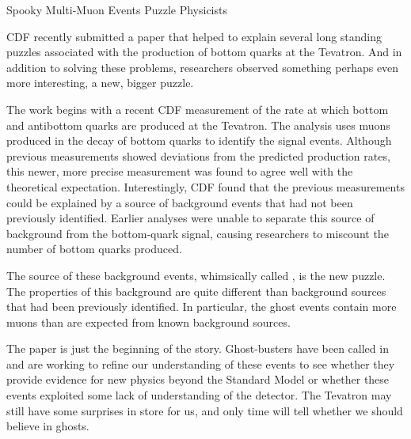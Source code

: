 \begin{multimuons-2}[enhanced, tikz={rotate=0}]{Spooky Multi-Muon Events Puzzle Physicists}
  \begin{multicols}{3}
    CDF recently submitted a paper that helped to explain several long
    standing puzzles associated with the production of bottom quarks
    at the Tevatron. And in addition to solving these problems,
    researchers observed something perhaps even more interesting, a
    new, bigger puzzle. 
    
    The work begins with a recent CDF measurement of the rate at which
    bottom and antibottom quarks are produced at the Tevatron. The
    analysis uses muons produced in the decay of bottom quarks to identify
    the signal events. Although previous measurements showed deviations
    from the predicted production rates, this newer, more precise
    measurement was found to agree well with the theoretical
    expectation. Interestingly, CDF found that the previous measurements
    could be explained by a source of background events that had not been
    previously identified. Earlier analyses were unable to separate this
    source of background from the bottom-quark signal, causing researchers
    to miscount the number of bottom quarks produced. 
    
    The source of these background events, whimsically called , is the new puzzle. The properties of this background are
    quite different than background sources that had been previously
    identified. In particular, the ghost events contain more muons than
    are expected from known background sources. 
    
    The paper is just the beginning of the story. Ghost-busters have been
    called in and are working to refine our understanding of these events
    to see whether they provide evidence for new physics beyond the
    Standard Model or whether these events exploited some lack of
    understanding of the detector. The Tevatron may still have some
    surprises in store for us, and only time will tell whether we should
    believe in ghosts.
    

\end{multicols}
\end{multimuons-2}
